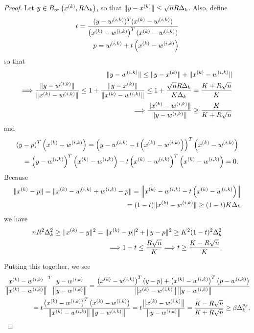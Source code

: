 \begin{proof}
Let $y \in B_{\infty}\left(x^{(k)}, R \Delta_k\right)$, so that $\|y - x^{(k)}\| \le \sqrt{n}R\Delta_k$.
Also, define
\begin{align*}
t  = \frac{(y - {w^{(i, k)}})^T(x^{(k)} - {w^{(i, k)}})}{\left(x^{(k)} - {w^{(i, k)}}\right)^T(x^{(k)} - {w^{(i, k)}})} \\
p = {w^{(i, k)}} + t\left(x^{(k)} - {w^{(i, k)}}\right)
\end{align*}
so that
\begin{align*}
\|y - {w^{(i, k)}}\| \le \|y - x^{(k)}\| + \|x^{(k)} - {w^{(i, k)}}\| \\
\Longrightarrow \frac{\|y - {w^{(i, k)}}\|}{\|x^{(k)} - {w^{(i, k)}}\|} \le 1 +  \frac{\|y - x^{(k)}\|}{\|x^{(k)} - {w^{(i, k)}}\|} 
\le 1 + \frac{\sqrt{n}R\Delta_k}{K \Delta_k} = \frac {K+R\sqrt{n}}{K} \\
\Longrightarrow \frac{\|x^{(k)} - {w^{(i, k)}}\|}{\|y - {w^{(i, k)}}\|} \ge \frac {K}{K+R\sqrt{n}}
\end{align*}
and
\begin{align*}
\left(y - p\right)^T\left(x^{(k)} - {w^{(i, k)}}\right) = 
\left(y - {w^{(i, k)}} - t\left(x^{(k)} - {w^{(i, k)}}\right)\right)^T\left(x^{(k)} - {w^{(i, k)}}\right) \\
= \left(y - {w^{(i, k)}}\right)^T\left(x^{(k)} - {w^{(i, k)}}\right) - t\left(x^{(k)} - {w^{(i, k)}}\right)^T\left(x^{(k)} - {w^{(i, k)}}\right) = 0.
\end{align*}
Because
\begin{align*}
\|x^{(k)} - p\| = \|x^{(k)} - {w^{(i, k)}} + {w^{(i, k)}} - p\| = \left\|x^{(k)} - {w^{(i, k)}} - t\left(x^{(k)} - {w^{(i, k)}}\right)\right\| \\
= (1-t)\|x^{(k)} - {w^{(i, k)}}\| \ge (1-t)K\Delta_k
\end{align*}
we have
\begin{align*}
nR^2\Delta_k^2 \ge \|x^{(k)} - y\|^2 = \|x^{(k)} - p\|^2 + \|y - p\|^2 \ge K^2(1-t)^2\Delta_k^2  \\
\Longrightarrow 1-t \le \frac {R\sqrt{n}} {K} 
\Longrightarrow t \ge \frac {K - R\sqrt{n}}{K}.
\end{align*}

Putting this together, we see
\begin{align*}
\frac{x^{(k)} - {w^{(i, k)}}}{\left\|x^{(k)} - {w^{(i, k)}}\right\|}^T\frac{y - {w^{(i, k)}}}{\left\|y - {w^{(i, k)}}\right\|} 
= \frac{\left(x^{(k)} - {w^{(i, k)}}\right) ^T\left(y - p\right) + \left(x^{(k)} - {w^{(i, k)}}\right)^T\left(p - {w^{(i, k)}}\right)}{\left\|x^{(k)} - {w^{(i, k)}}\right\|\left\|y - {w^{(i, k)}}\right\|} \\
= t\frac{\left(x^{(k)} - {w^{(i, k)}}\right)^T\left(x^{(k)} - {w^{(i, k)}}\right)}{\left\|x^{(k)} - {w^{(i, k)}}\right\|\left\|y - {w^{(i, k)}}\right\|}
= t \frac{\left\|x^{(k)} - {w^{(i, k)}}\right\|}{\left\|y - {w^{(i, k)}}\right\|}
= \frac {K - R\sqrt{n}}{K + R\sqrt{n}} \ge \beta \Delta_k^{p_{\beta}}.
\end{align*}
\end{proof}

